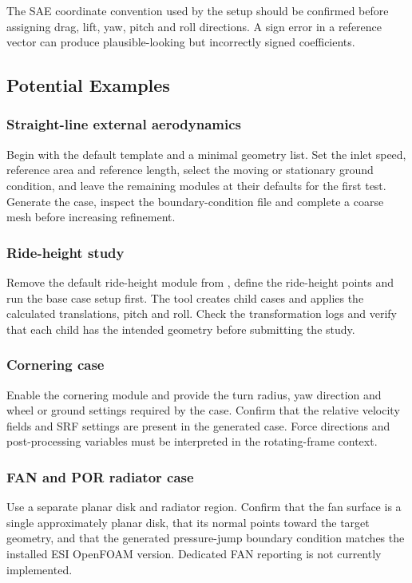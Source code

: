The SAE coordinate convention used by the setup should be confirmed before assigning drag, lift, yaw, pitch and roll directions. A sign error in a reference vector can produce plausible-looking but incorrectly signed coefficients.

\subsection{Potential Examples}

\subsubsection{Straight-line external aerodynamics}

Begin with the default template and a minimal geometry list. Set the inlet speed, reference area and reference length, select the moving or stationary ground condition, and leave the remaining modules at their defaults for the first test. Generate the case, inspect the boundary-condition file and complete a coarse mesh before increasing refinement.

\subsubsection{Ride-height study}

Remove the default ride-height module from , define the ride-height points and run the base case setup first. The tool creates child cases and applies the calculated translations, pitch and roll. Check the transformation logs and verify that each child has the intended geometry before submitting the study.

\subsubsection{Cornering case}

Enable the cornering module and provide the turn radius, yaw direction and wheel or ground settings required by the case. Confirm that the relative velocity fields and SRF settings are present in the generated case. Force directions and post-processing variables must be interpreted in the rotating-frame context.

\subsubsection{FAN and POR radiator case}

Use a separate planar  disk and radiator  region. Confirm that the fan surface is a single approximately planar disk, that its normal points toward the target geometry, and that the generated pressure-jump boundary condition matches the installed ESI OpenFOAM version. Dedicated FAN reporting is not currently implemented.

